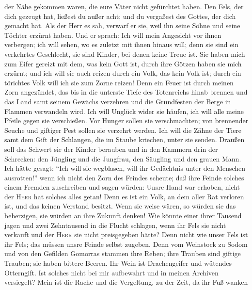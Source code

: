 der Nähe gekommen waren, die eure Väter nicht gefürchtet haben.
 Den Fels, der dich gezeugt hat, ließest du außer acht;
und du vergaßest des Gottes, der dich gemacht hat.  Als
der Herr es sah, verwarf er sie, weil ihn seine Söhne und seine Töchter
erzürnt haben.  Und er sprach: Ich will mein Angesicht
vor ihnen verbergen; ich will sehen, wo es zuletzt mit ihnen hinaus
will; denn sie sind ein verkehrtes Geschlecht, sie sind Kinder, bei
denen keine Treue ist.  Sie haben mich zum Eifer gereizt
mit dem, was kein Gott ist, durch ihre Götzen haben sie mich erzürnt;
und ich will sie auch reizen durch ein Volk, das kein Volk ist; durch
ein törichtes Volk will ich sie zum Zorne reizen!  Denn
ein Feuer ist durch meinen Zorn angezündet, das bis in die unterste
Tiefe des Totenreichs hinab brennen und das Land samt seinem Gewächs
verzehren und die Grundfesten der Berge in Flammen verwandeln wird.
 Ich will Unglück wider sie häufen, ich will alle meine
Pfeile gegen sie verschießen.  Vor Hunger sollen sie
verschmachten; von brennender Seuche und giftiger Pest sollen sie
verzehrt werden. Ich will die Zähne der Tiere samt dem Gift der
Schlangen, die im Staube kriechen, unter sie senden. 
Draußen soll das Schwert sie der Kinder berauben und in den Kammern drin
der Schrecken: den Jüngling und die Jungfrau, den Säugling und den
grauen Mann.  Ich hätte gesagt: ``Ich will sie wegblasen,
will ihr Gedächtnis unter den Menschen ausrotten!''  wenn
ich nicht den Zorn des Feindes scheute; daß ihre Feinde solches einem
Fremden zuschreiben und sagen würden: Unsre Hand war erhoben, nicht der
\textsc{Herr} hat solches alles getan!  Denn es ist ein
Volk, an dem aller Rat verloren ist, und das keinen Verstand besitzt.
 Wenn sie weise wären, so würden sie das beherzigen, sie
würden an ihre Zukunft denken!  Wie könnte einer ihrer
Tausend jagen und zwei Zehntausend in die Flucht schlagen, wenn ihr Fels
sie nicht verkauft und der \textsc{Herr} sie nicht preisgegeben hätte?
 Denn nicht wie unser Fels ist ihr Fels; das müssen unsre
Feinde selbst zugeben.  Denn vom Weinstock zu Sodom und
von den Gefilden Gomorras stammen ihre Reben; ihre Trauben sind giftige
Trauben; sie haben bittere Beeren.  Ihr Wein ist
Drachengeifer und wütendes Otterngift.  Ist solches nicht
bei mir aufbewahrt und in meinen Archiven versiegelt? 
Mein ist die Rache und die Vergeltung, zu der Zeit, da ihr Fuß wanken
